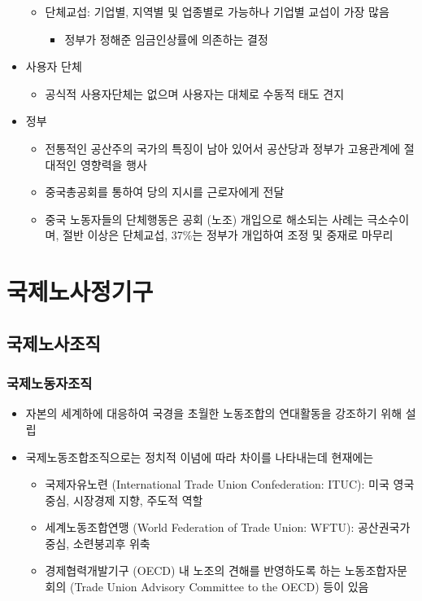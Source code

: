 \documentclass[aspectratio=169,xcolor=dvipsnames,handout]{beamer}
\begin{document}
\begin{frame}[allowframebreaks]
\begin{itemize}[<+->]
\begin{itemize}
            \item 단체교섭: 기업별, 지역별 및 업종별로 가능하나 기업별 교섭이 가장 많음
            \begin{itemize}
                    \item 정부가 정해준 임금인상률에 의존하는 결정
            \end{itemize}
        \end{itemize}
    \framebreak%
        \item 사용자 단체
        \begin{itemize}
            \item 공식적 사용자단체는 없으며 사용자는 대체로 수동적 태도 견지
        \end{itemize}
        \item 정부
        \begin{itemize}
            \item 전통적인 공산주의 국가의 특징이 남아 있어서 공산당과 정부가 고용관계에 절대적인 영향력을 행사 
            \item 중국총공회를 통하여 당의 지시를 근로자에게 전달
            \item 중국 노동자들의 단체행동은 공회 (노조) 개입으로 해소되는 사례는 극소수이며, 절반 이상은 단체교섭, 37\%는 정부가 개입하여 조정 및 중재로 마무리
        \end{itemize}
    \end{itemize}
\end{frame}


\section{국제노사정기구}
\subsection{국제노사조직}
\begin{frame}
    \frametitle{국제노동자조직}
    \begin{itemize}[<+->]
        \item 자본의 세계하에 대응하여 국경을 초월한 노동조합의 연대활동을 강조하기 위해 설립
        \item 국제노동조합조직으로는 정치적 이념에 따라 차이를 나타내는데 현재에는 
        \begin{itemize}
            \item 국제자유노련 (International Trade Union Confederation: ITUC): 미국 영국중심, 시장경제 지향, 주도적 역할
            \item 세계노동조합연맹 (World Federation of Trade Union: WFTU): 공산권국가중심, 소련붕괴후 위축
            \item 경제협력개발기구 (OECD) 내 노조의 견해를 반영하도록 하는 노동조합자문회의 (Trade Union Advisory Committee to the OECD) 등이 있음
        \end{itemize}
    \end{itemize}
\end{frame}
\end{document}
